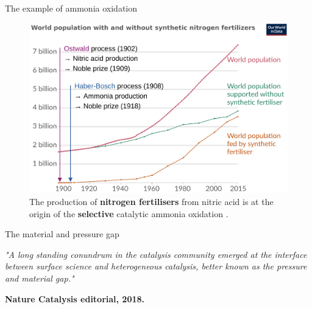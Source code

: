 \documentclass[final]{beamer}
\newlength{\colwidth}
\begin{document}
\begin{frame}[t]
\begin{columns}[t]
\begin{column}{\colwidth}
\begin{alertblock}{The example of ammonia oxidation}
        \begin{figure}
            \centering
            \includegraphics[width=0.95\colwidth]{Figures/WorldPopAmmonia.pdf}
            \caption{The production of \textbf{nitrogen fertilisers} from nitric acid is at the  origin of the \textbf{selective} catalytic ammonia oxidation \cite{Erisman2008}.}
        \end{figure}
                
    \end{alertblock}

    \begin{block}{The material and pressure gap}

        \textit{"A long standing conundrum in the catalysis community emerged at the interface between surface science and heterogeneous catalysis, better known as the pressure and material gap."}
        
        \textbf{Nature Catalysis editorial, 2018.}
        
        \vspace{1cm}


\end{block}
\end{column}
\end{columns}
\end{frame}
\end{document}
